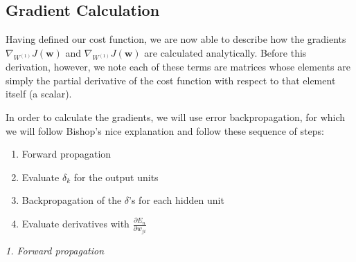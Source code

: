 \documentclass[10pt]{article}
\begin{document}
\subsection*{Gradient Calculation}

Having defined our cost function, we are now able to describe how the gradients $\nabla_{W^{(1)}} J(\mathbf{w})$ and $\nabla_{W^{(1)}} J(\mathbf{w})$ are calculated analytically.  Before this derivation, however, we note each of these terms are matrices whose elements are simply the partial derivative of the cost function with respect to that element itself (a scalar).

In order to calculate the gradients, we will use error backpropagation, for which we will follow Bishop's nice explanation and follow these sequence of steps:

\begin{enumerate}
 \item Forward propagation
 \item Evaluate $\delta_k$ for the output units
 \item Backpropagation of the $\delta$'s for each hidden unit
 \item Evaluate derivatives with $\frac{\partial E_n}{\partial w_{ji}}$
\end{enumerate}

\textit{1. Forward propagation}
\end{document}
